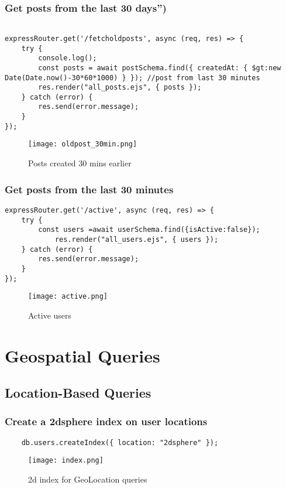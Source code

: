 \documentclass[12pt,a4paper]{article}
\begin{document}
\subsubsection{Get posts from the last 30 days”)}
\begin{lstlisting}

expressRouter.get('/fetcholdposts', async (req, res) => {
    try {
        console.log();
        const posts = await postSchema.find({ createdAt: { $gt:new Date(Date.now()-30*60*1000) } }); //post from last 30 minutes
        res.render("all_posts.ejs", { posts });
    } catch (error) {
        res.send(error.message);
    }
});

\end{lstlisting}
    \begin{figure}[H]
    \centering
    \texttt{[image: oldpost\_30min.png]}
    \caption{Posts created 30 mins earlier}
    \label{fig:sample}
\end{figure}


\subsubsection{Get posts from the last 30 minutes}
\begin{lstlisting}
expressRouter.get('/active', async (req, res) => {
    try {
        const users =await userSchema.find({isActive:false});
            res.render("all_users.ejs", { users });
    } catch (error) {
        res.send(error.message);
    }
});

\end{lstlisting}
    \begin{figure}[H]
    \centering
    \texttt{[image: active.png]}
    \caption{Active users}
    \label{fig:sample}
\end{figure}

\section{Geospatial Queries}
\subsection{Location-Based Queries}
\subsubsection{Create a 2dsphere index on user locations}
\begin{lstlisting}
    db.users.createIndex({ location: "2dsphere" });
\end{lstlisting}
\begin{figure}[H]
    \centering
    \texttt{[image: index.png]}
    \caption{2d index for GeoLocation queries}
    \label{fig:sample}
\end{figure}
\end{document}
